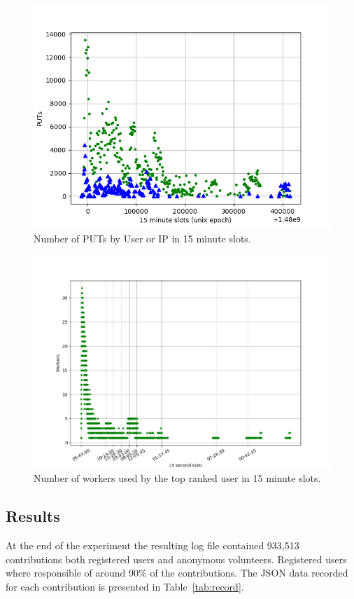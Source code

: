 \documentclass{llncs}
\begin{document}
\begin{figure}[t]
    \centering
        \includegraphics[width=5in]{img/puts_by_time.png}
    \caption{Number of PUTs by User or IP in 15 minute slots.
    }
    \label{fig:puts-time}
\end{figure}
\begin{figure}[t]
    \centering
        \includegraphics[width=5in]{img/workers_best_user.png}
    \caption{ Number of workers used by the top ranked user in 15 minute slots.
    }
    \label{fig:top-user}
\end{figure}

\subsection{Results}
\label{sec:results}
At the end of the experiment the resulting log file contained 933,513 contributions both 
registered users and anonymous volunteers. Registered users where responsible of around
90\% of the contributions. The JSON data recorded for each contribution is  presented 
in Table~\ref{tab:record}.  
\end{document}
